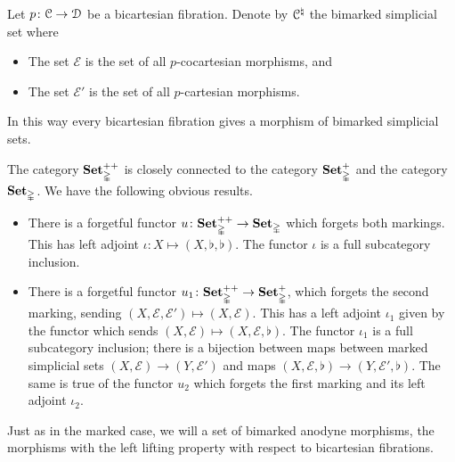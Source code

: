 \documentclass[main.tex]{subfiles}
\begin{document}
\begin{example}
  \label{eg:bicartesian_marking}
  Let $p\colon \mathcal{C} \to \mathcal{D}$ be a bicartesian fibration. Denote by $\mathcal{C}^{\natural}$ the bimarked simplicial set where
  \begin{itemize}
    \item The set $\mathcal{E}$ is the set of all $p$-cocartesian morphisms, and

    \item The set $\mathcal{E}'$ is the set of all $p$-cartesian morphisms.
  \end{itemize}

  In this way every bicartesian fibration gives a morphism of bimarked simplicial sets.
\end{example}

The category $\mathbf{Set}_{\mathbb{\Delta}}^{++}$ is closely connected to the category $\mathbf{Set}_{\mathbb{\Delta}}^{+}$ and the category $\mathbf{Set}_{\mathbb{\Delta}}$. We have the following obvious results.
\begin{itemize}
  \item There is a forgetful functor $u\colon \mathbf{Set}_{\mathbb{\Delta}}^{++} \to \mathbf{Set}_{\mathbb{\Delta}}$ which forgets both markings. This has left adjoint $\iota\colon X \mapsto (X, \flat, \flat)$. The functor $\iota$ is a full subcategory inclusion.

  \item There is a forgetful functor $u_{1}\colon \mathbf{Set}_{\mathbb{\Delta}}^{++} \to \mathbf{Set}_{\mathbb{\Delta}}^{+}$, which forgets the second marking, sending $(X, \mathcal{E}, \mathcal{E}') \mapsto (X, \mathcal{E})$. This has a left adjoint $\iota_{1}$ given by the functor which sends $(X, \mathcal{E}) \mapsto (X, \mathcal{E}, \flat)$. The functor $\iota_{1}$ is a full subcategory inclusion; there is a bijection between maps between marked simplicial sets $(X, \mathcal{E}) \to (Y, \mathcal{E}')$ and maps $(X, \mathcal{E}, \flat) \to (Y, \mathcal{E}', \flat)$. The same is true of the functor $u_{2}$ which forgets the first marking and its left adjoint $\iota_{2}$.
\end{itemize}

Just as in the marked case, we will a set of bimarked anodyne morphisms, the morphisms with the left lifting property with respect to bicartesian fibrations.
\end{document}
